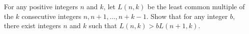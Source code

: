 For any positive integers $n$ and $k$,  let $L(n,k)$ be the least common multiple of the $k$ consecutive integers $n,n+1,\ldots ,n+k-1$. Show that for any integer $b$,  there exist integers $n$ and $k$ such that $L(n,k)>bL(n+1,k)$.
